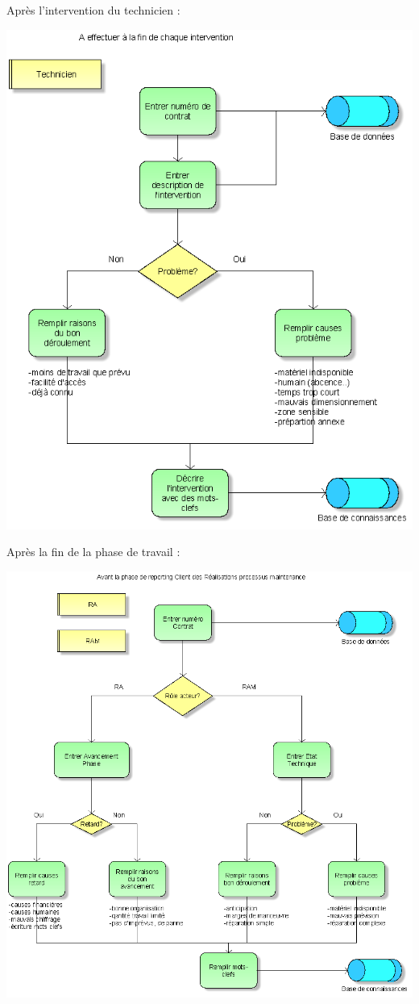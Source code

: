 Après l'intervention du technicien :
\begin {center}
\includegraphics[width=\textwidth]{png_cible_fonctionnelle/RemplissageTechnicienFinIntervention.png}
\end {center}

Après la fin de la phase de travail :
\begin {center}
\includegraphics[width=\textwidth]{png_cible_fonctionnelle/RemplissageEtatDesLieuxApresFinPhaseTravail.png}
\end {center}


